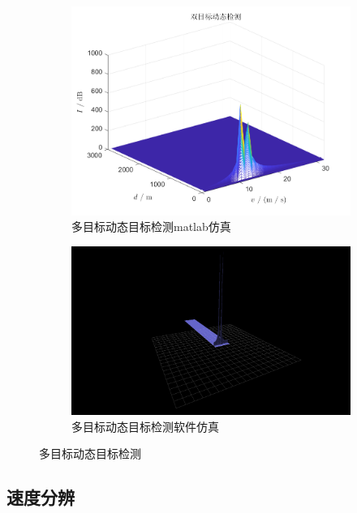 \documentclass{article}
\newcounter{sub}
\begin{document}
\begin{figure}[H]
	\centering
	\begin{subfigure}[H]{.6\linewidth}
		\centering
		\includegraphics[width=\linewidth]{two-MTD-matlab.png}
		\caption{多目标动态目标检测matlab仿真}
		\label{fig:多目标动态目标检测matlab仿真}
	\end{subfigure}
	\quad
	\begin{subfigure}[H]{.6\linewidth}
		\centering
		\includegraphics[width=\linewidth]{two-MTD-software.png}
		\caption{多目标动态目标检测软件仿真}
		\label{fig:多目标动态目标检测软件仿真}
	\end{subfigure}
	\caption{多目标动态目标检测}
	\label{fig:多目标动态目标检测}
\end{figure}

\subsection{速度分辨}%
\label{sub:速度分辨}
\end{document}
